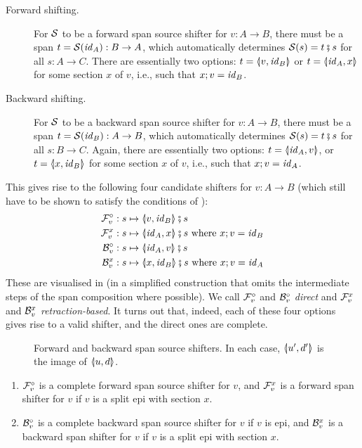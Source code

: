 \begin{description}
\item[Forward shifting.] For $\cS$ to be a forward span source shifter for $v:A\to B$, there must be a span $t=\cS(\id_A):B\to A$, which automatically determines $\cS(s)=t\spcomp s$ for all $s:A\to C$. There are essentially two options: $t=\spanof{v}{\id_B}$ or $t=\spanof{\id_A}{x}$ for some section $x$ of $v$, i.e., such that $x;v=\id_B$.

\item[Backward shifting.] For $\cS$ to be a backward span source shifter for $v:A\to B$, there must be a span $t=\cS(\id_B):A\to B$, which automatically determines $\cS(s)=t \spcomp s$ for all $s:B\to C$. Again, there are essentially two options: $t=\spanof{\id_A}{v}$, or $t=\spanof{x}{\id_B}$ for some section $x$ of $v$, i.e., such that $x;v=\id_A$.
\end{description}
%
This gives rise to the following four candidate shifters for $v:A\to B$ (which still have to be shown to satisfy the conditions of ):
%
\begin{align*}
\dF v & : s \mapsto \spanof{v}{\id_B}\spcomp s \\
\rF v x& : s \mapsto \spanof{\id_A}{x}\spcomp s \text{ where $x;v=\id_B$} \\
\dB v& : s \mapsto \spanof{\id_A}{v}\spcomp s \\
\rB v x& : s \mapsto \spanof{x}{\id_B}\spcomp s \text{ where $x;v=\id_A$}
\end{align*}
%
These are visualised in  (in a simplified construction that omits the intermediate steps of the span composition where possible). We call $\dF v$ and $\dB v$ \emph{direct} and $\rF v x$ and $\rB v x$ \emph{retraction-based}. It turns out that, indeed, each of these four options gives rise to a valid shifter, and the direct ones are complete.
%
\begin{figure}[t]
\centering

\caption{Forward and backward span source shifters. In each case, $\spanof{u'}{d'}$ is the image of $\spanof{u}{d}$.}
\end{figure}
%
\begin{proposition}
\begin{enumerate}[topsep=\smallskipamount]
\item $\cF_v^\circ$ is a complete forward span source shifter for $v$, and $\cF_v^x$ is a forward span shifter for $v$ if $v$ is a split epi with section $x$.
\item $\cB_v^\circ$ is a complete backward span source shifter for $v$ if $v$ is epi, and $\cB_v^x$ is a backward span shifter for $v$ if $v$ is a split epi with section $x$.
\end{enumerate}
\end{proposition}
